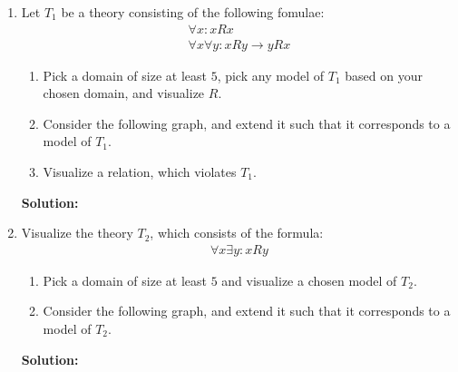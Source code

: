 \documentclass[11pt,a4paper]{uebung}
\newcommand{\solution}[1]{\par {\bf Solution:}\\#1}
\begin{document}
\begin{enumerate}
\item Let $T_1$ be a theory consisting of the following fomulae:
  \begin{align*}
    \forall x: x R x\\
    \forall x \forall y: x R y \rightarrow y R x
  \end{align*}
  \begin{enumerate}
  \item Pick a domain of size at least $5$, pick any model of $T_1$ based on
    your chosen domain, and visualize $R$.
  \item Consider the following graph, and extend it such that it corresponds
    to a model of $T_1$.
  \item Visualize a relation, which violates $T_1$.
  \end{enumerate}

\solution{

}

\item Visualize the theory $T_2$, which consists of the formula:
  \begin{align*}
    \forall x \exists y: x R y
  \end{align*}
  \begin{enumerate}
  \item Pick a domain of size at least $5$ and visualize a chosen model of
    $T_2$.
  \item Consider the following graph, and extend it such that it corresponds
    to a model of $T_2$.

  \end{enumerate}

\solution{

}

\end{enumerate}
\end{document}
